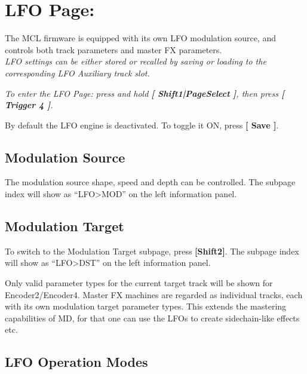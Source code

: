 \chapter{LFO Page:}
The MCL firmware is equipped with its own LFO modulation source, and controls both track parameters and master FX parameters.\\\textit{LFO settings can be either stored or recalled by saving or loading to the corresponding LFO Auxiliary track slot.}

\textit{To enter the LFO Page: press and hold \textbf{[ Shift1|PageSelect ]}, then press \textbf{[ Trigger 4 ]}.}

By default the LFO engine is deactivated. To toggle it ON, press \textbf{[ Save ]}.


\section{Modulation Source}

The modulation source shape, speed and depth can be controlled. The subpage index will show as ``LFO>MOD'' on the left information panel.


\newpage


\section{Modulation Target}
To switch to the Modulation Target subpage, press \textbf{[Shift2]}. The subpage index will show as ``LFO>DST'' on the left information panel.


Only valid parameter types for the current target track will be shown for Encoder2/Encoder4. Master FX machines are regarded as individual tracks, each with its own modulation target parameter types. This extends the mastering capabilities of MD, for that one can use the LFOs to create sidechain-like effects etc.


\section{LFO Operation Modes}

